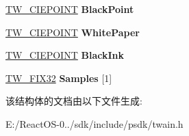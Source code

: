 \begin{DoxyCompactItemize}
\mbox{\label{struct_t_w___c_i_e_c_o_l_o_r_a5a0fe2b6052d357ed73d481257259d1c}} 
\hyperlink{struct_t_w___c_i_e_p_o_i_n_t}{T\+W\+\_\+\+C\+I\+E\+P\+O\+I\+NT} {\bfseries Black\+Point}
\item 
\mbox{\label{struct_t_w___c_i_e_c_o_l_o_r_ac046e359d2b2c6c811a9f778f2416c07}} 
\hyperlink{struct_t_w___c_i_e_p_o_i_n_t}{T\+W\+\_\+\+C\+I\+E\+P\+O\+I\+NT} {\bfseries White\+Paper}
\item 
\mbox{\label{struct_t_w___c_i_e_c_o_l_o_r_a88b2eca99f125b5347be589f0db58e96}} 
\hyperlink{struct_t_w___c_i_e_p_o_i_n_t}{T\+W\+\_\+\+C\+I\+E\+P\+O\+I\+NT} {\bfseries Black\+Ink}
\item 
\mbox{\label{struct_t_w___c_i_e_c_o_l_o_r_a22894e9df13a98dae6eba82b035245fe}} 
\hyperlink{struct_t_w___f_i_x32}{T\+W\+\_\+\+F\+I\+X32} {\bfseries Samples} \mbox{[}1\mbox{]}
\end{DoxyCompactItemize}


该结构体的文档由以下文件生成\+:\begin{DoxyCompactItemize}
\item 
E\+:/\+React\+O\+S-\/0../sdk/include/psdk/twain.\+h\end{DoxyCompactItemize}
